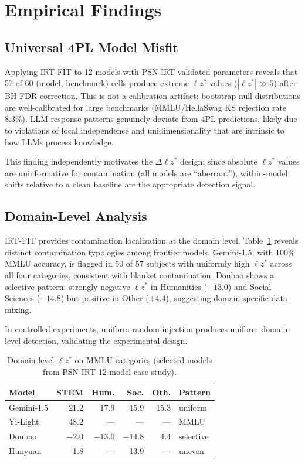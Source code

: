 \documentclass[11pt,a4paper]{article}
\begin{document}
\section{Empirical Findings}\label{sec:empirical}

\subsection{Universal 4PL Model Misfit}

Applying IRT-FIT to 12 models with PSN-IRT validated parameters reveals that 57 of 60 (model, benchmark) cells produce extreme $\ell z^*$ values ($|\ell z^*| \gg 5$) after BH-FDR correction. This is not a calibration artifact: bootstrap null distributions are well-calibrated for large benchmarks (MMLU/HellaSwag KS rejection rate 8.3\%). LLM response patterns genuinely deviate from 4PL predictions, likely due to violations of local independence and unidimensionality that are intrinsic to how LLMs process knowledge.

This finding independently motivates the $\Delta\ell z^*$ design: since absolute $\ell z^*$ values are uninformative for contamination (all models are ``aberrant''), within-model shifts relative to a clean baseline are the appropriate detection signal.

\subsection{Domain-Level Analysis}\label{sec:domain}

IRT-FIT provides contamination localization at the domain level. Table~\ref{tab:domain} reveals distinct contamination typologies among frontier models. Gemini-1.5, with 100\% MMLU accuracy, is flagged in 50 of 57 subjects with uniformly high $\ell z^*$ across all four categories, consistent with blanket contamination. Doubao shows a selective pattern: strongly negative $\ell z^*$ in Humanities ($-13.0$) and Social Sciences ($-14.8$) but positive in Other ($+4.4$), suggesting domain-specific data mixing.

In controlled experiments, uniform random injection produces uniform domain-level detection, validating the experimental design.

\begin{table}[t]
\centering
\caption{Domain-level $\ell z^*$ on MMLU categories (selected models from PSN-IRT 12-model case study).}
\label{tab:domain}
\small
\begin{tabular}{lrrrrl}
\toprule
Model & STEM & Hum. & Soc. & Oth. & Pattern \\
\midrule
Gemini-1.5 & 21.2 & 17.9 & 15.9 & 15.3 & uniform \\
Yi-Light. & 48.2 & --- & --- & --- & MMLU \\
Doubao & $-2.0$ & $-13.0$ & $-14.8$ & 4.4 & selective \\
Hunyuan & 1.8 & --- & 13.9 & --- & uneven \\
\bottomrule
\end{tabular}
\end{table}
\end{document}
